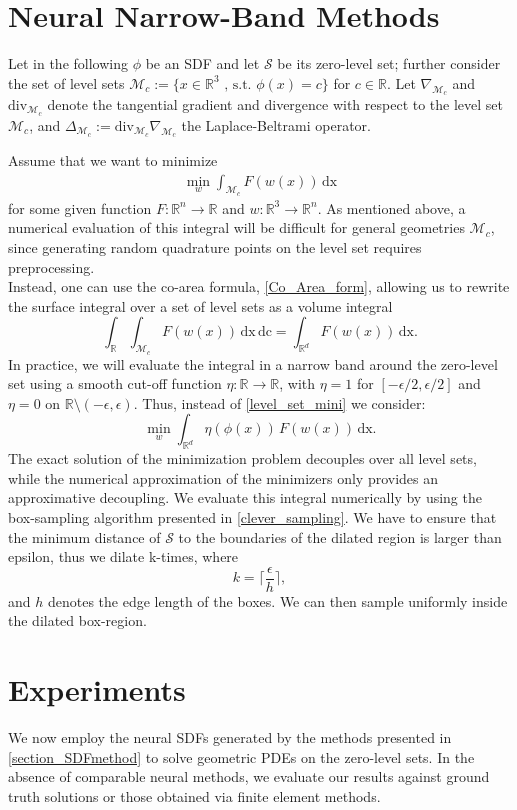 \documentclass[draft,12pt,openany]{book}
\newcommand{\R}{\mathbb{R}}
\def\S{\mathcal{S}}
\theoremstyle{plainnormal}
\theoremstyle{remark}
\begin{document}
\section{Neural Narrow-Band Methods}
Let in the following $\phi$ be an SDF and let $\S$ be its zero-level set; further consider the set of level sets $\mathcal{M}_c := \{x\in \R^3 \text{ , s.t. } \phi(x) = c\}$ for $c \in \R$. Let $\nabla_{\mathcal{M}_c}$ and $\mathrm{div}_{\mathcal{M}_c}$ denote the tangential gradient and divergence with respect to the level set $\mathcal M_c$, and $\Delta_{\mathcal M_c} := \mathrm{div}_{\mathcal{M}_c}\nabla_{\mathcal{M}_c} $ the Laplace-Beltrami operator.\par
Assume that we want to minimize \begin{align}\label{level_set_mini}
    \min_w\int_{\mathcal{M}_c} F(w(x)) \,\mathrm{dx}
\end{align} for some given function $F:\R^n \rightarrow\R$ and $w: \R^3 \rightarrow\R^n$. As mentioned above, a numerical evaluation of this integral will be difficult for general geometries $\mathcal M_c$, since generating random quadrature points on the level set requires preprocessing. \\
Instead, one can use the co-area formula, \cref{Co_Area_form}, allowing us to rewrite the surface integral over a set of level sets as a volume integral
$$\int_\R\int_{\mathcal{M}_c} F(w(x)) \,\mathrm{dx}\,\mathrm{dc}= \int_{\R^d}F(w(x)) \,\mathrm{dx}.$$
In practice, we will evaluate the integral in a narrow band around the zero-level set using a smooth cut-off function $\eta: \R\rightarrow\R$, with $\eta = 1$ for $[-\epsilon/2,\epsilon/2]$ and $\eta = 0$ on $\R \setminus(-\epsilon, \epsilon)$. Thus, instead of \cref{level_set_mini} we consider: 
$$\min_w \int_{\R^d} \eta(\phi(x))\,F(w(x))  \,\mathrm{dx}.$$
The exact solution of the minimization problem decouples over all level sets, while the numerical approximation of the minimizers only provides an approximative decoupling.
We evaluate this integral numerically by using the box-sampling algorithm presented in \cref{clever_sampling}. We have to ensure that the minimum distance of $\S$ to the boundaries of the dilated region is larger than epsilon, thus we dilate k-times, where $$k = \Big\lceil\frac{\epsilon}{h}\Big\rceil,$$
and $h$ denotes the edge length of the boxes. We can then sample uniformly inside the dilated box-region.
\section{Experiments}
We now employ the neural SDFs generated by the methods presented in \cref{section_SDFmethod} to solve geometric PDEs on the zero-level sets. In the absence of comparable neural methods, we evaluate our results against ground truth solutions or those obtained via finite element methods.
\end{document}
